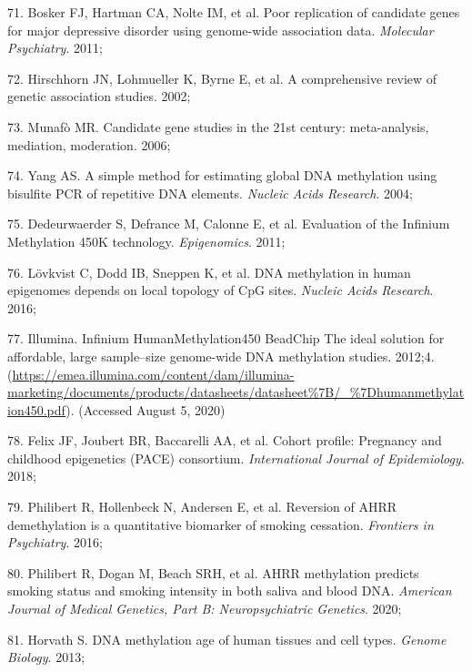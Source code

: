 \documentclass[11pt,oneside]{bristolthesis}
\newenvironment{cslreferences}%
  {}%
  {\par}
\begin{document}
\begin{cslreferences}
\leavevmode\hypertarget{ref-Bosker2011}{}%
71. Bosker FJ, Hartman CA, Nolte IM, et al. Poor replication of candidate genes for major depressive disorder using genome-wide association data. \emph{Molecular Psychiatry}. 2011;

\leavevmode\hypertarget{ref-Hirschhorn2002}{}%
72. Hirschhorn JN, Lohmueller K, Byrne E, et al. A comprehensive review of genetic association studies. 2002;

\leavevmode\hypertarget{ref-Munafo2006}{}%
73. Munafò MR. Candidate gene studies in the 21st century: meta-analysis, mediation, moderation. 2006;

\leavevmode\hypertarget{ref-Yang2004}{}%
74. Yang AS. A simple method for estimating global DNA methylation using bisulfite PCR of repetitive DNA elements. \emph{Nucleic Acids Research}. 2004;

\leavevmode\hypertarget{ref-Dedeurwaerder2011}{}%
75. Dedeurwaerder S, Defrance M, Calonne E, et al. Evaluation of the Infinium Methylation 450K technology. \emph{Epigenomics}. 2011;

\leavevmode\hypertarget{ref-Lovkvist2016}{}%
76. Lövkvist C, Dodd IB, Sneppen K, et al. DNA methylation in human epigenomes depends on local topology of CpG sites. \emph{Nucleic Acids Research}. 2016;

\leavevmode\hypertarget{ref-Illumina2012}{}%
77. Illumina. Infinium HumanMethylation450 BeadChip The ideal solution for affordable, large sample--size genome-wide DNA methylation studies. 2012;4. (\url{https://emea.illumina.com/content/dam/illumina-marketing/documents/products/datasheets/datasheet\%7B/_\%7Dhumanmethylation450.pdf}). (Accessed August 5, 2020)

\leavevmode\hypertarget{ref-Felix2018}{}%
78. Felix JF, Joubert BR, Baccarelli AA, et al. Cohort profile: Pregnancy and childhood epigenetics (PACE) consortium. \emph{International Journal of Epidemiology}. 2018;

\leavevmode\hypertarget{ref-Philibert2016}{}%
79. Philibert R, Hollenbeck N, Andersen E, et al. Reversion of AHRR demethylation is a quantitative biomarker of smoking cessation. \emph{Frontiers in Psychiatry}. 2016;

\leavevmode\hypertarget{ref-Philibert2020}{}%
80. Philibert R, Dogan M, Beach SRH, et al. AHRR methylation predicts smoking status and smoking intensity in both saliva and blood DNA. \emph{American Journal of Medical Genetics, Part B: Neuropsychiatric Genetics}. 2020;

\leavevmode\hypertarget{ref-Horvath2013}{}%
81. Horvath S. DNA methylation age of human tissues and cell types. \emph{Genome Biology}. 2013;


\end{cslreferences}
\end{document}
